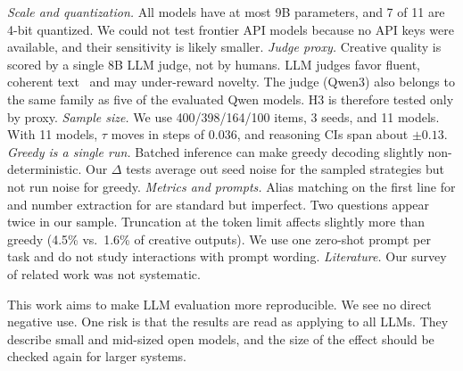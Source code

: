\emph{Scale and quantization.} All models have at most 9B parameters, and 7 of 11 are 4-bit quantized. We could not test frontier API models because no API keys were available, and their sensitivity is likely smaller.
\emph{Judge proxy.} Creative quality is scored by a single 8B LLM judge, not by humans. LLM judges favor fluent, coherent text~\citep{zheng2023judging} and may under-reward novelty. The judge (Qwen3) also belongs to the same family as five of the evaluated Qwen models. H3 is therefore tested only by proxy.
\emph{Sample size.} We use 400/398/164/100 items, 3 seeds, and 11 models. With 11 models, $\tau$ moves in steps of 0.036, and reasoning CIs span about $\pm0.13$.
\emph{Greedy is a single run.} Batched \vllm inference can make greedy decoding slightly non-deterministic. Our $\Delta$ tests average out seed noise for the sampled strategies but not run noise for greedy.
\emph{Metrics and prompts.} Alias matching on the first line for \triviaqa and number extraction for \gsm are standard but imperfect. Two \triviaqa questions appear twice in our sample. Truncation at the token limit affects \tone slightly more than greedy (4.5\% vs.\ 1.6\% of creative outputs). We use one zero-shot prompt per task and do not study interactions with prompt wording.
\emph{Literature.} Our survey of related work was not systematic.

 This work aims to make LLM evaluation more reproducible. We see no direct negative use. One risk is that the results are read as applying to all LLMs. They describe small and mid-sized open models, and the size of the effect should be checked again for larger systems.

